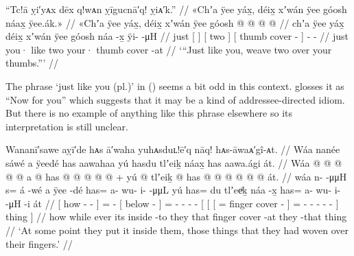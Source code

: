 \ex\label{ex:92-157-weave-two-on-your-thumbs}%
%
\begingl
	\glpreamble	“Tc!ā ỵi′yᴀx dēx q!wᴀn ỵīgucnā′q! ỵiᴀ′k.” //
	\glpreamble	«\!Chʼa ÿee yáx̱, déix̱ xʼwán ÿee góosh náax̱ ÿee.ák.\!» //
	\gla	«\!Chʼa {} ÿee yáx̱, {} {} déix̱ {} xʼwán
		{} ÿee góosh  @ {} {}
		 @ {} @ {} @ {} //
	\glb	\pqp{}chʼa {} ÿee yáx̱ {} {} déix̱ {} xʼwán
		{} ÿee góosh náa -x̱ {}
		{} ÿi-  -μH //
	\glc	\pqp{}just {}[   {}] {}[ two {}] 
		{}[  thumb cover - {}]
		\· -  - //
	\gld	\pqp{}just {} you· like {} {} two {} 
		{} your· thumb cover -at {}
		 {} {} {} //
	\glft	‘“Just like you, weave two over your thumbs.”’
		//
\endgl
\xe

The phrase  ‘just like you (pl.)’ in (\lastx) seems a bit odd in this context.
\citeauthor{swanton:1909} glosses it as “Now for you” which suggests that it may be a kind of addressee-directed idiom.
But there is no example of anything like this phrase elsewhere so its interpretation is still unclear.

\ex\label{ex:92-158-put-inside-them-woven-things}%
%
\begingl
	\glpreamble	Wananī′sawe aỵī′de hᴀs ā′waha yuhᴀsduʟ!ē′q nāq! hᴀs-āwaᴀ′gî-ᴀt. //
	\glpreamble	Wáa nanée sáwé a ÿeedé has aawahaa yú hasdu tlʼeiḵ náax̱ has aawa.ági át. //
	\gla	{} Wáa  @ {} @ {} @ {} {}
		 @ {} @ {}
		{} a  @ {} {}
		has @  @ {} @ {} @ {} @ {} +
		{} yú {} {}  @ {} tlʼeiḵ  @ {} {}
			has @  @ {} @ {} @ {} @ {} @ {} {}
			át. {} //
	\glb	{} wáa n-  -μμH {} {} 
		s= á -wé
		{} a ÿee -dé {}
		has= a- wu- i-  -μμL
		{} yú {} {} has= du tlʼeeͥḵ náa -x̱ {}
			has= a- wu- i-  -μH -i {}
			át {} //
	\glc	{}[ how -  - \· {}]
		=  -
		{}[  below - {}]
		= - - -  -
		{}[  {}[ {}[ = 
				finger cover - {}]
			= - - -
				 - - {}]
			thing {}] //
	\gld	{} how  {} {} \·while {}
		ever\·  {}
		{} its inside -to {}
		they  {} {} {} {}
		{} that {} {}  {} finger cover -at {}
			they  {} {} {} {} -that {}
			thing {} //
	\glft	‘At some point they put it inside them, those things that they had woven over their fingers.’
		//
\endgl
\xe


